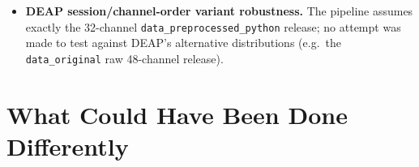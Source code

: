 \documentclass[11pt]{report}
\begin{document}
\begin{itemize}
{        scripts.} \texttt{track\_a\_ablation.py},
        \texttt{track\_a\_calibration\_loso.py},
        \texttt{track\_a\_repeated\_nested\_cv.py},
        \texttt{track\_a\_ea\_coral\_stacked.py}, and several others call
        \texttt{tree\_method="hist"} without \texttt{device="cuda"}, so they
        ran on CPU despite the project having a capable GPU; only the main
        notebook's own Track A cell and (implicitly) none of the
        cross-corpus script's XGBoost calls request the GPU explicitly.
  \item \textbf{DEAP session/channel-order variant robustness.} The pipeline
        assumes exactly the 32-channel \texttt{data\_preprocessed\_python}
        release; no attempt was made to test against DEAP's alternative
        distributions (e.g.\ the \texttt{data\_original} raw 48-channel
        release).
\end{itemize}

\chapter{What Could Have Been Done Differently}
\label{ch:could-have}
\end{document}
